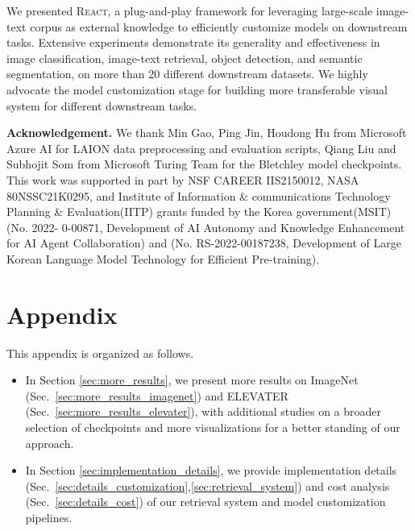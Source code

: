 \documentclass[10pt,twocolumn,letterpaper]{article}
\renewcommand{\paragraph}[1]{\vspace{1.25mm}\noindent\textbf{#1}}
\newcommand{\shortname}{\textsc{React}}
\begin{document}
We presented \shortname{}, a plug-and-play framework for leveraging large-scale image-text corpus as external knowledge to efficiently customize models on downstream tasks.  Extensive experiments demonstrate its generality and effectiveness in image classification, image-text retrieval, object detection, and semantic segmentation, on more than 20 different downstream datasets.  We highly advocate the model customization stage for building more transferable visual system for different downstream tasks.

\paragraph{Acknowledgement.}
We thank Min Gao, Ping Jin, Houdong Hu from Microsoft Azure AI for LAION data preprocessing and evaluation scripts, Qiang Liu and Subhojit Som from Microsoft Turing Team for the Bletchley model checkpoints.
This work was supported in part by NSF CAREER IIS2150012, NASA 80NSSC21K0295, and Institute of Information \& communications Technology Planning \& Evaluation(IITP) grants funded by the Korea government(MSIT) (No. 2022- 0-00871, Development of AI Autonomy and Knowledge Enhancement for AI Agent Collaboration) and (No. RS-2022-00187238, Development of Large Korean Language Model Technology for Efficient Pre-training). 

{\small


}

\appendix
\section*{Appendix}

This appendix is organized as follows. 

\vspace{6pt}

\begin{itemize}

\item In Section \ref{sec:more_results}, we present more results on ImageNet (Sec.~\ref{sec:more_results_imagenet}) and ELEVATER (Sec.~\ref{sec:more_results_elevater}), with additional studies on a broader selection of checkpoints and more visualizations for a better standing of our approach.

\vspace{-6pt}
\item In Section \ref{sec:implementation_details}, we provide implementation details (Sec.~\ref{sec:details_customization},\ref{sec:retrieval_system}) and cost analysis (Sec.~\ref{sec:details_cost}) of our retrieval system and model customization pipelines.
\end{itemize}
\end{document}

